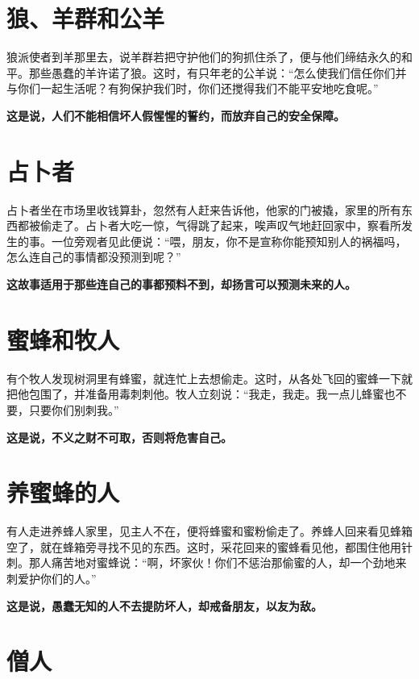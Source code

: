 \section{狼、羊群和公羊}

狼派使者到羊那里去，说羊群若把守护他们的狗抓住杀了，便与他们缔结永久的和平。那些愚蠢的羊许诺了狼。这时，有只年老的公羊说：“怎么使我们信任你们并与你们一起生活呢？有狗保护我们时，你们还搅得我们不能平安地吃食呢。”

{\bfseries \color{red}这是说，人们不能相信坏人假惺惺的誓约，而放弃自己的安全保障。}

\section{占卜者}

占卜者坐在市场里收钱算卦，忽然有人赶来告诉他，他家的门被撬，家里的所有东西都被偷走了。占卜者大吃一惊，气得跳了起来，唉声叹气地赶回家中，察看所发生的事。一位旁观者见此便说：“喂，朋友，你不是宣称你能预知别人的祸福吗，怎么连自己的事情都没预测到呢？”

{\bfseries \color{red}这故事适用于那些连自己的事都预料不到，却扬言可以预测未来的人。}

\section{蜜蜂和牧人}

有个牧人发现树洞里有蜂蜜，就连忙上去想偷走。这时，从各处飞回的蜜蜂一下就把他包围了，并准备用毒刺刺他。牧人立刻说：“我走，我走。我一点儿蜂蜜也不要，只要你们别刺我。”

{\bfseries \color{red}这是说，不义之财不可取，否则将危害自己。}

\section{养蜜蜂的人}

有人走进养蜂人家里，见主人不在，便将蜂蜜和蜜粉偷走了。养蜂人回来看见蜂箱空了，就在蜂箱旁寻找不见的东西。这时，采花回来的蜜蜂看见他，都围住他用针刺。那人痛苦地对蜜蜂说：“啊，坏家伙！你们不惩治那偷蜜的人，却一个劲地来刺爱护你们的人。”

{\bfseries \color{red}这是说，愚蠢无知的人不去提防坏人，却戒备朋友，以友为敌。}

\section{僧人}


